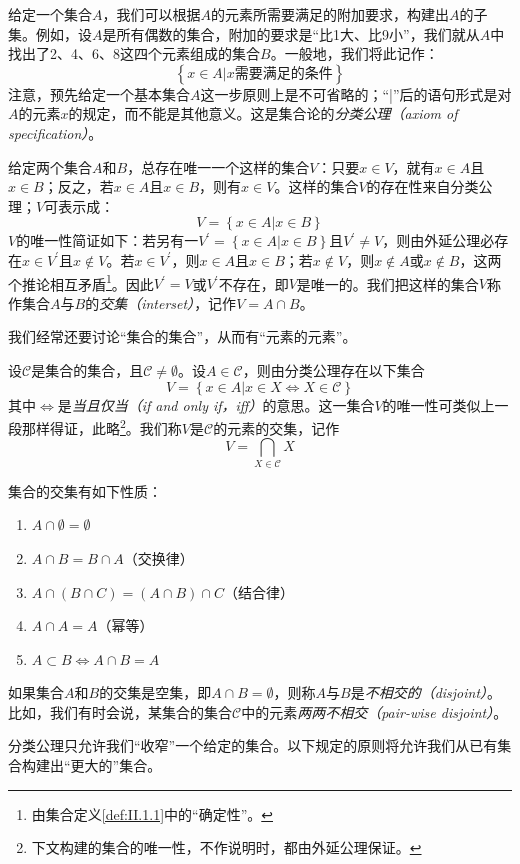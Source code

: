 \documentclass[../main.tex]{subfiles}
\begin{document}
给定一个集合$A$，我们可以根据$A$的元素所需要满足的附加要求，构建出$A$的子集。例如，设$A$是所有偶数的集合，附加的要求是“比1大、比9小”，我们就从$A$中找出了2、4、6、8这四个元素组成的集合$B$。一般地，我们将此记作：
\[
    \left\{x\in A|\text{$x$需要满足的条件}\right\}
\]
注意，预先给定一个基本集合$A$这一步原则上是不可省略的；“|”后的语句形式是对$A$的元素$x$的规定，而不能是其他意义。这是集合论的\emph{分类公理（axiom of specification）}。

给定两个集合$A$和$B$，总存在唯一一个这样的集合$V$：只要$x\in V$，就有$x\in A$且$x\in B$；反之，若$x\in A$且$x\in B$，则有$x\in V$。这样的集合$V$的存在性来自分类公理；$V$可表示成：
\[
    V=\left\{x\in A|x\in B\right\}
\]
$V$的唯一性简证如下：若另有一$V^\prime=\left\{x\in A|x\in B\right\}$且$V^\prime\neq V$，则由外延公理必存在$x\in V^\prime$且$x\notin V$。若$x\in V^\prime$，则$x\in A$且$x\in B$；若$x\notin V$，则$x\notin A$或$x\notin B$，这两个推论相互矛盾\footnote{由集合定义\ref{def:II.1.1}中的“确定性”。}。因此$V^\prime=V$或$V^\prime$不存在，即$V$是唯一的。我们把这样的集合$V$称作集合$A$与$B$的\emph{交集（interset）}，记作$V=A\cap B$。

我们经常还要讨论“集合的集合”，从而有“元素的元素”。

设$\mathcal{C}$是集合的集合，且$\mathcal{C}\neq\emptyset$。设$A\in\mathcal{C}$，则由分类公理存在以下集合
\[
    V=\left\{x\in A|x\in X\Leftrightarrow X\in\mathcal{C}\right\}
\]
其中$\Leftrightarrow$是\emph{当且仅当（if and only if，iff）}的意思。这一集合$V$的唯一性可类似上一段那样得证，此略\footnote{下文构建的集合的唯一性，不作说明时，都由外延公理保证。}。我们称$V$是$\mathcal{C}$的元素的交集，记作
\[
    V=\bigcap_{X\in\mathcal{C}}X
\]

集合的交集有如下性质：
\begin{enumerate}
    \item $A\cap\emptyset=\emptyset$
    \item $A\cap B=B\cap A$（交换律）
    \item $A\cap\left(B\cap C\right)=\left(A\cap B\right)\cap C$（结合律）
    \item $A\cap A=A$（幂等）
    \item $A\subset B\Leftrightarrow A\cap B=A$
\end{enumerate}

如果集合$A$和$B$的交集是空集，即$A\cap B=\emptyset$，则称$A$与$B$是\emph{不相交的（disjoint）}。比如，我们有时会说，某集合的集合$\mathcal{C}$中的元素\emph{两两不相交（pair-wise disjoint）}。

分类公理只允许我们“收窄”一个给定的集合。以下规定的原则将允许我们从已有集合构建出“更大的”集合。
\end{document}
